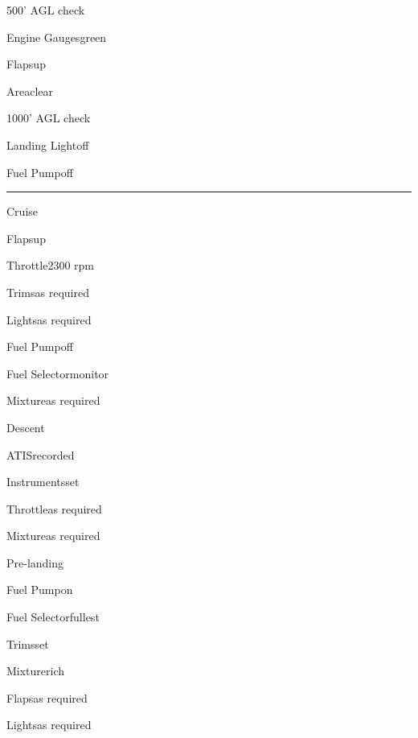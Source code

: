 \begin{multicols}{2}
\begin{checklist}{500' AGL check}
    \item{Engine Gauges}{green}
    \item{Flaps}{up}
    \item{Area}{clear}
\end{checklist}

\begin{checklist}{1000' AGL check}
    \item{Landing Light}{off}
    \item{Fuel Pump}{off}
\end{checklist}

\noindent\rule{0.9\linewidth}{0.4pt}
\vspace{0.5em}

\begin{checklist}{Cruise}
    \item{Flaps}{up}
    \item{Throttle}{$2300$ rpm}
    \item{Trims}{as required}
    \item{Lights}{as required}
    \item{Fuel Pump}{off}
    \item{Fuel Selector}{monitor}
    \item{Mixture}{as required}
\end{checklist}

\vfill\null
\columnbreak

\begin{checklist}{Descent}
    \item{ATIS}{recorded}
    \item{Instruments}{set}
    \item{Throttle}{as required}
    \item{Mixture}{as required}
\end{checklist}

\begin{checklist}{Pre-landing}
    \item{Fuel Pump}{on}
    \item{Fuel Selector}{fullest}
    \item{Trims}{set}
    \item{Mixture}{rich}
    \item{Flaps}{as required}
    \item{Lights}{as required}
\end{checklist}


\end{multicols}
